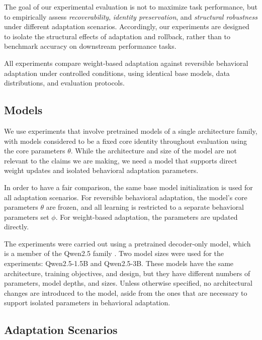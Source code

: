 \documentclass{article}
\begin{document}
	The goal of our experimental evaluation is not to maximize task performance, but to empirically assess \emph{recoverability}, \emph{identity preservation}, and \emph{structural robustness} under different adaptation scenarios. Accordingly, our experiments are designed to isolate the structural effects of adaptation and rollback, rather than to benchmark accuracy on downstream performance tasks.
	
	All experiments compare weight-based adaptation against reversible behavioral adaptation under controlled conditions, using identical base models, data distributions, and evaluation protocols.
	
	\subsection{Models}
	\label{sec:models}
	
	We use experiments that involve pretrained models of a single architecture family, with models considered to be a fixed core identity throughout evaluation using the core parameters $\theta$. While the architecture and size of the model are not relevant to the claims we are making, we need a model that supports direct weight updates and isolated behavioral adaptation parameters.
	
	In order to have a fair comparison, the same base model initialization is used for all adaptation scenarios. For reversible behavioral adaptation, the model's core parameters $\theta$ are frozen, and all learning is restricted to a separate behavioral parameters set $\phi$. For weight-based adaptation, the parameters are updated directly.

	The experiments were carried out using a pretrained decoder-only model, which is a member of the Qwen2.5 family \cite{qwen2024qwen2}. Two model sizes were used for the experiments: Qwen2.5-1.5B and Qwen2.5-3B. These models have the same architecture, training objectives, and design, but they have different numbers of parameters, model depths, and sizes. Unless otherwise specified, no architectural changes are introduced to the model, aside from the ones that are necessary to support isolated parameters in behavioral adaptation.
	
	
	\subsection{Adaptation Scenarios}
	\label{sec:adaptation_scenarios}
	
\end{document}
